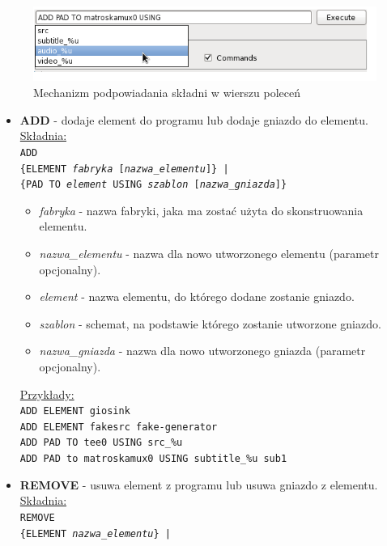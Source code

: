 \documentclass[12pt]{article}
\begin{document}
\begin{figure}[H]
  \includegraphics[width=140mm]{img/command-line.png}
  \caption{Mechanizm podpowiadania składni w wierszu poleceń}
  \label{fig:commandLine}
\end{figure}
\begin{itemize}
  \setlength{\itemsep}{0em}
\item \textbf{ADD} - dodaje element do programu lub dodaje gniazdo do elementu.
\underline{Składnia:} \\
\texttt{ADD \\
\hspace*{2em} \{ELEMENT \textit{fabryka} [\textit{nazwa\_elementu}]\} | \\
\hspace*{2em} \{PAD TO \textit{element} USING \textit{szablon} [\textit{nazwa\_gniazda}]\} }
\begin{itemize}
\item \textit{fabryka} - nazwa fabryki, jaka ma zostać użyta do skonstruowania elementu.
\item \textit{nazwa\_elementu} - nazwa dla nowo utworzonego elementu (parametr opcjonalny).
\item \textit{element} - nazwa elementu, do którego dodane zostanie gniazdo.
\item \textit{szablon} - schemat, na podstawie którego zostanie utworzone gniazdo.
\item \textit{nazwa\_gniazda} - nazwa dla nowo utworzonego gniazda (parametr opcjonalny).
\end{itemize}
\underline{Przykłady:} \\
\texttt{ADD ELEMENT giosink} \\
\texttt{ADD ELEMENT fakesrc fake-generator} \\
\texttt{ADD PAD TO tee0 USING src\_\%u} \\
\texttt{ADD PAD to matroskamux0 USING subtitle\_\%u sub1}
\item \textbf{REMOVE} - usuwa element z programu lub usuwa gniazdo z elementu. \\
\underline{Składnia:} \\
\texttt{REMOVE \\
\hspace*{2em} \{ELEMENT \textit{nazwa\_elementu}\} | \\
}
\end{itemize}
\end{document}
